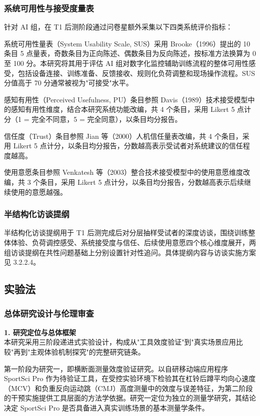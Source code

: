 \documentclass[UTF8,zihao=-4,twoside,openany]{ctexbook}
\begin{document}
\subsubsection{系统可用性与接受度量表}
针对 AI 组，在 T1 后测阶段通过问卷星额外采集以下四类系统评价指标：

系统可用性量表（System Usability Scale, SUS）采用 Brooke（1996）提出的 10 条目 5 点量表，奇数条目为正向陈述、偶数条目为反向陈述，按标准方法换算为 0 至 100 分。本研究将其用于评估 AI 组对数字化监控辅助训练流程的整体可用性感受，包括设备连接、训练准备、反馈接收、规则化负荷调整和现场操作流程。SUS 分值高于 70 分通常被视为"可接受"水平。

感知有用性（Perceived Usefulness, PU）条目参照 Davis（1989）技术接受模型中的感知有用性维度，结合本研究系统功能改编，共 4 个条目，采用 Likert 5 点计分（1 = 完全不同意，5 = 完全同意），以条目均分报告。

信任度（Trust）条目参照 Jian 等（2000）人机信任量表改编，共 4 个条目，采用 Likert 5 点计分，以条目均分报告，分数越高表示受试者对系统建议的信任程度越高。

使用意愿条目参照 Venkatesh 等（2003）整合技术接受模型中的使用意愿维度改编，共 3 个条目，采用 Likert 5 点计分，以条目均分报告，分数越高表示后续继续使用的意愿越强。

\subsubsection{半结构化访谈提纲}
半结构化访谈提纲用于 T1 后测完成后对分层抽样受试者的深度访谈，围绕训练整体体验、负荷调控感受、系统接受度与信任、后续使用意愿四个核心维度展开，两组访谈提纲在共性问题基础上分别设置针对性追问。具体提纲内容与访谈实施方案见 3.2.2.4。

\subsection{实验法}

\subsubsection{总体研究设计与伦理审查}
\noindent \textbf{1. 研究定位与总体框架} \\
本研究采用三阶段递进式实验设计，构成从"工具效度验证"到"真实场景应用比较"再到"主观体验机制探究"的完整研究链条。

第一阶段为研究一，即横断面测量效度验证研究。以自研移动端应用程序 SportSci Pro 作为待验证工具，在受控实验环境下检验其在杠铃后蹲平均向心速度（MCV）和负重反向运动跳（CMJ）高度测量中的效度与误差特征，为第二阶段的干预实施提供工具层面的方法学依据。研究一定位为独立的测量学研究，其结论决定 SportSci Pro 是否具备进入真实训练场景的基本测量学条件。
\end{document}
